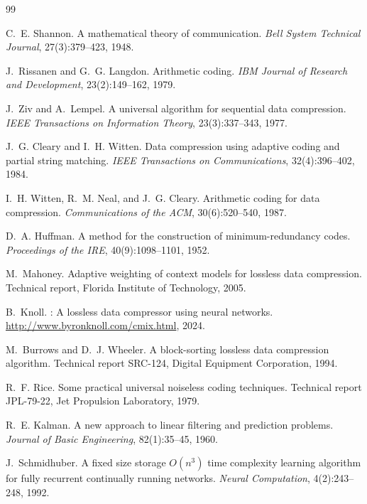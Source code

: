 \documentclass[10pt,twocolumn]{article}
\begin{document}

\begin{thebibliography}{99}

C.~E. Shannon.
\newblock A mathematical theory of communication.
\newblock \emph{Bell System Technical Journal}, 27(3):379--423, 1948.

J.~Rissanen and G.~G. Langdon.
\newblock Arithmetic coding.
\newblock \emph{IBM Journal of Research and Development}, 23(2):149--162, 1979.

J.~Ziv and A.~Lempel.
\newblock A universal algorithm for sequential data compression.
\newblock \emph{IEEE Transactions on Information Theory}, 23(3):337--343, 1977.

J.~G. Cleary and I.~H. Witten.
\newblock Data compression using adaptive coding and partial string matching.
\newblock \emph{IEEE Transactions on Communications}, 32(4):396--402, 1984.

I.~H. Witten, R.~M. Neal, and J.~G. Cleary.
\newblock Arithmetic coding for data compression.
\newblock \emph{Communications of the ACM}, 30(6):520--540, 1987.

D.~A. Huffman.
\newblock A method for the construction of minimum-redundancy codes.
\newblock \emph{Proceedings of the IRE}, 40(9):1098--1101, 1952.

M.~Mahoney.
\newblock Adaptive weighting of context models for lossless data compression.
\newblock Technical report, Florida Institute of Technology, 2005.

B.~Knoll.
: A lossless data compressor using neural networks.
\newblock \url{http://www.byronknoll.com/cmix.html}, 2024.

M.~Burrows and D.~J. Wheeler.
\newblock A block-sorting lossless data compression algorithm.
\newblock Technical report SRC-124, Digital Equipment Corporation, 1994.

R.~F. Rice.
\newblock Some practical universal noiseless coding techniques.
\newblock Technical report JPL-79-22, Jet Propulsion Laboratory, 1979.

R.~E. Kalman.
\newblock A new approach to linear filtering and prediction problems.
\newblock \emph{Journal of Basic Engineering}, 82(1):35--45, 1960.

J.~Schmidhuber.
\newblock A fixed size storage $O(n^3)$ time complexity learning algorithm for
  fully recurrent continually running networks.
\newblock \emph{Neural Computation}, 4(2):243--248, 1992.


\end{thebibliography}
\end{document}
